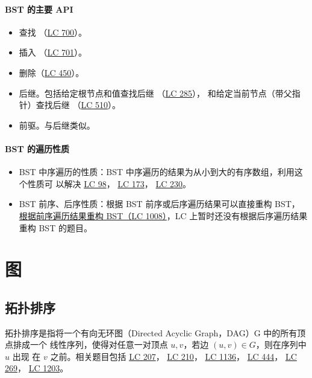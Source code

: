 \paragraph{BST 的主要 API}
\begin{itemize}
  \item 查找
    （\href{https://leetcode.com/problems/search-in-a-binary-search-tree}{LC
      700}）。
  \item 插入
    （\href{https://leetcode.com/problems/insert-into-a-binary-search-tree}{LC
      701}）。
  \item 删除（\href{https://leetcode.com/problems/delete-node-in-a-bst}{LC 450}）。
  \item 后继。包括给定根节点和值查找后继
    （\href{https://leetcode.com/problems/inorder-successor-in-bst}{LC 285}），
    和给定当前节点（带父指针）查找后继
    （\href{https://leetcode.com/problems/inorder-successor-in-bst-ii}{LC 510}）。
  \item 前驱。与后继类似。
\end{itemize}

\paragraph{BST 的遍历性质}
\begin{itemize}
\item BST 中序遍历的性质：BST 中序遍历的结果为从小到大的有序数组，利用这个性质可
  以解决
  \href{https://leetcode.com/problems/validate-binary-search-tree}
  {LC 98}，
  \href{https://leetcode.com/problems/binary-search-tree-iterator}
  {LC 173}，
  \href{https://leetcode.com/problems/kth-smallest-element-in-a-bst}
  {LC 230}。
\item BST 前序、后序性质：根据 BST 前序或后序遍历结果可以直接重构 BST，
  \href{https://leetcode.com/problems/construct-binary-search-tree-from-preorder-traversal}
  {根据前序遍历结果重构 BST（LC 1008）}，LC 上暂时还没有根据后序遍历结果重构 BST
  的题目。
\end{itemize}

\section{图}

\subsection{拓扑排序}
拓扑排序是指将一个有向无环图（Directed Acyclic Graph，DAG）G 中的所有顶点排成一个
线性序列，使得对任意一对顶点 $u, v$，若边 $(u, v) \in G$，则在序列中 $u$ 出现
在 $v$ 之前。相关题目包括
\href{https://leetcode.com/problems/course-schedule/}{LC 207}，
\href{https://leetcode.com/problems/course-schedule-ii/}{LC 210}，
\href{https://leetcode.com/problems/parallel-courses}{LC 1136}，
\href{https://leetcode.com/problems/sequence-reconstruction}{LC 444}，
\href{https://leetcode.com/problems/alien-dictionary}{LC 269}，
\href{https://leetcode.com/problems/sort-items-by-groups-respecting-dependencies/}{LC 1203}。

